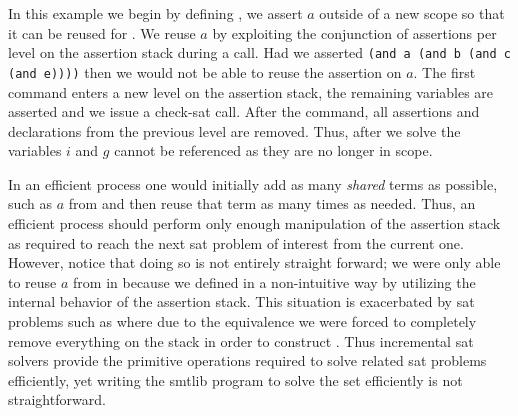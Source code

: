 In this example we begin by defining \pV{}, we assert $a$ outside of a new scope
so that it can be reused for \qV{}. We reuse $a$ by exploiting the conjunction
of assertions per level on the assertion stack during a  call. Had
we asserted \lstinline{(and a (and b (and c (and e))))} then we would not be
able to reuse the assertion on $a$. The first  command enters a new
level on the assertion stack, the remaining variables are asserted and we issue
a check-sat call. After the  command, all assertions and declarations
from the previous level are removed. Thus, after we solve \qV{} the variables
$i$ and $g$ cannot be referenced as they are no longer in scope.

In an efficient process one would initially add as many \emph{shared} terms as
possible, such as $a$ from \pV{} and then reuse that term as many times as
needed. Thus, an efficient process should perform only enough manipulation of
the assertion stack as required to reach the next \ac{sat} problem of interest
from the current one. However, notice that doing so is not entirely straight
forward; we were only able to reuse $a$ from \pV{} in \qV{} because we defined
\pV{} in a non-intuitive way by utilizing the internal behavior of the assertion
stack. This situation is exacerbated by \ac{sat} problems such as \rV{} where
due to the equivalence we were forced to completely remove everything on the
stack in order to construct \rV{}. Thus incremental \ac{sat} solvers provide the
primitive operations required to solve related \ac{sat} problems efficiently,
yet writing the \acl{smtlib} program to solve the set efficiently is not
straightforward.

